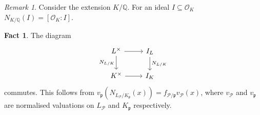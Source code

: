 \documentclass[11pt]{article}
\theoremstyle{definition}
\newtheorem*{fact}{Fact}
\theoremstyle{plain}
\theoremstyle{remark}
\newtheorem*{remark}{Remark}
\newcommand{\bQ}{\mathbb{Q}}
\newcommand{\cO}{\mathcal{O}}
\newcommand{\cP}{\mathcal{P}}
\newcommand{\fp}{\mathfrak{p}}
\begin{document}
\begin{remark}
    Consider the extension $K / \bQ$. For an ideal $I \subseteq \cO_K$ $N_{K / \bQ}(I) = [\cO_K : I]$.
\end{remark}

\begin{fact} The diagram
    \begin{equation*}
    \begin{tikzcd}
        L^\times \arrow[d, "N_{L/K}"'] \arrow[r] & I_L \arrow[d, "N_{L/K}"]\\
        K^\times \arrow[r] & I_K
    \end{tikzcd}
    \end{equation*}
    commutes. This follows from $v_\fp(N_{L_\cP/K_\fp}(x)) = f_{\cP / \fp} v_\cP(x)$, where $v_\cP$ and $v_\fp$ are normalised valuations on $L_\cP$ and $K_\fp$ respectively.
\end{fact}
\end{document}
